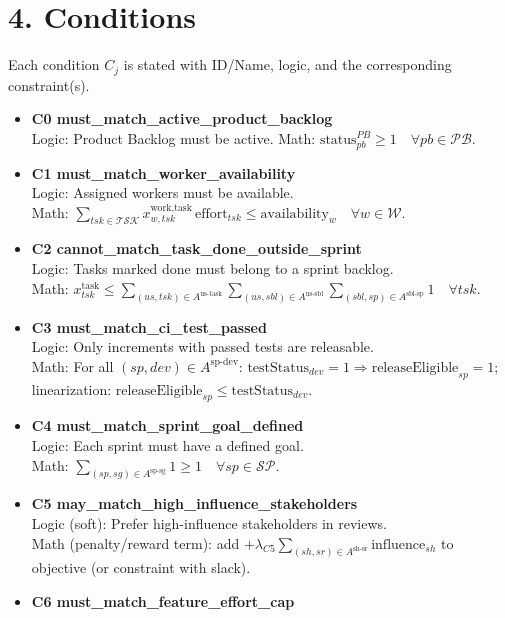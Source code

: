 \documentclass[11pt,a4paper]{article}
\begin{document}
\section{4. Conditions}
\noindent Each condition $C_j$ is stated with ID/Name, logic, and the corresponding constraint(s).\par
\begin{itemize}
  \item \textbf{C0 must\_match\_active\_product\_backlog}\\
  Logic: Product Backlog must be active. \quad
  Math: $\text{status}^{PB}_{pb} \ge 1 \quad \forall pb\in\mathcal{PB}$.
  \item \textbf{C1 must\_match\_worker\_availability}\\
  Logic: Assigned workers must be available.\\
  Math: $\sum_{tsk\in\mathcal{TSK}} x^{\text{work,task}}_{w,tsk}\,\text{effort}_{tsk} \le \text{availability}_w \quad \forall w\in\mathcal{W}$.
  \item \textbf{C2 cannot\_match\_task\_done\_outside\_sprint}\\
  Logic: Tasks marked done must belong to a sprint backlog.\\
  Math: $x^{\text{task}}_{tsk} \le \sum_{(us,tsk)\in A^{\text{us-task}}}\sum_{(us,sbl)\in A^{\text{us-sbl}}}\sum_{(sbl,sp)\in A^{\text{sbl-sp}}} 1 \quad \forall tsk$.
  \item \textbf{C3 must\_match\_ci\_test\_passed}\\
  Logic: Only increments with passed tests are releasable.\\
  Math: For all $(sp,dev)\in A^{\text{sp-dev}}$: $\text{testStatus}_{dev}=1 \Rightarrow \text{releaseEligible}_{sp}=1$; linearization: $\text{releaseEligible}_{sp}\le \text{testStatus}_{dev}$.
  \item \textbf{C4 must\_match\_sprint\_goal\_defined}\\
  Logic: Each sprint must have a defined goal.\\
  Math: $\sum_{(sp,sg)\in A^{\text{sp-sg}}} 1 \ge 1 \quad \forall sp\in\mathcal{SP}$.
  \item \textbf{C5 may\_match\_high\_influence\_stakeholders}\\
  Logic (soft): Prefer high-influence stakeholders in reviews.\\
  Math (penalty/reward term): add $+\lambda_{C5}\sum_{(sh,sr)\in A^{\text{sh-sr}}}\text{influence}_{sh}$ to objective (or constraint with slack).
  \item \textbf{C6 must\_match\_feature\_effort\_cap}\\

\end{itemize}
\end{document}
